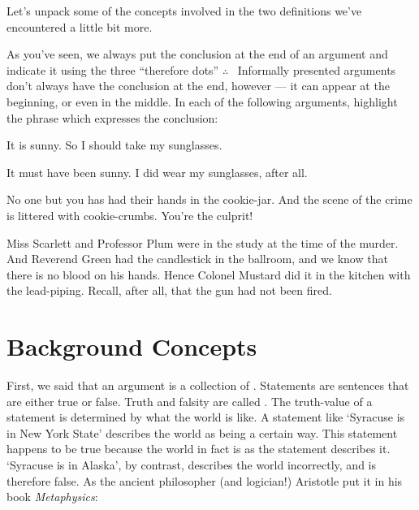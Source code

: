 
 
 \noindent Let's unpack some of the concepts involved in the two definitions we've encountered a little bit more.


\practiceproblems

As you've seen, we always put the conclusion at the end of an argument and indicate it using the three ``therefore dots'' $\therefore$ \  Informally presented arguments don't always have the conclusion at the end, however --- it can appear at the beginning, or even in the middle.  In each of the following arguments, highlight the phrase which expresses the conclusion:

\begin{earg}
	\item It is sunny. So I should take my sunglasses.
	\item It must have been sunny. I did wear my sunglasses, after all.
	\item No one but you has had their hands in the cookie-jar. And the scene of the crime is littered with cookie-crumbs. You're the culprit!
	\item Miss Scarlett and Professor Plum were in the study at the time of the murder. And Reverend Green had the candlestick in the ballroom, and we know that there is no blood on his hands. Hence Colonel Mustard did it in the kitchen with the lead-piping. Recall, after all, that the gun had not been fired.
\end{earg}


 
 \section{Background Concepts}\label{s:Background}
 
 First, we said that an argument is a collection of .  Statements are sentences that are either true or false.  Truth and falsity are called .  The truth-value of a statement is determined by what the world is like.  A statement like `Syracuse is in New York State' describes the world as being a certain way.  This statement happens to be  true because the world in fact is as the statement describes it.  `Syracuse is in Alaska', by contrast, describes the world incorrectly, and is therefore false.   As the ancient philosopher (and logician!) Aristotle put it in his book \emph{Metaphysics}:

